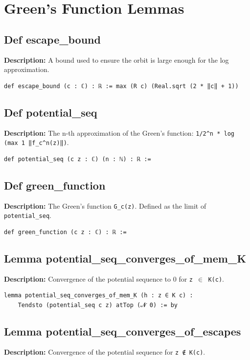 \section{Green's Function Lemmas}

\subsection*{Def escape\_bound}
\textbf{Description:} A bound used to ensure the orbit is large enough for the log approximation.

\begin{lstlisting}[language=Lean]
def escape_bound (c : ℂ) : ℝ := max (R c) (Real.sqrt (2 * ‖c‖ + 1))
\end{lstlisting}

\subsection*{Def potential\_seq}
\textbf{Description:} The n-th approximation of the Green's function: \texttt{1/2\^{}n * log (max 1 ‖f\_c\^{}n(z)‖)}.

\begin{lstlisting}[language=Lean]
def potential_seq (c z : ℂ) (n : ℕ) : ℝ :=
\end{lstlisting}

\subsection*{Def green\_function}
\textbf{Description:} The Green's function \texttt{G\_c(z)}. Defined as the limit of \texttt{potential\_seq}.

\begin{lstlisting}[language=Lean]
def green_function (c z : ℂ) : ℝ :=
\end{lstlisting}

\subsection*{Lemma potential\_seq\_converges\_of\_mem\_K}
\textbf{Description:} Convergence of the potential sequence to 0 for \texttt{z $\in$ K(c)}.

\begin{lstlisting}[language=Lean]
lemma potential_seq_converges_of_mem_K (h : z ∈ K c) :
    Tendsto (potential_seq c z) atTop (𝓝 0) := by
\end{lstlisting}

\subsection*{Lemma potential\_seq\_converges\_of\_escapes}
\textbf{Description:} Convergence of the potential sequence for \texttt{z ∉ K(c)}.

